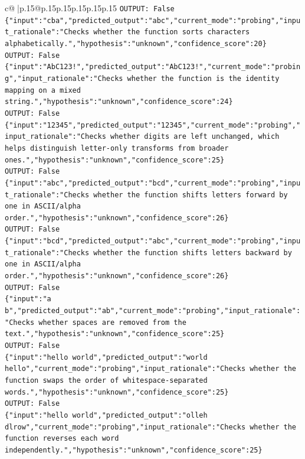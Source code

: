 \documentclass{article}
\begin{document}
{\begin{supertabular}{c@{$\;$}|p{.15\linewidth}@{}p{.15\linewidth}p{.15\linewidth}p{.15\linewidth}p{.15\linewidth}p{.15\linewidth}}
{{{\texttt{OUTPUT: False} \\
\texttt{\{"input":"cba","predicted\_output":"abc","current\_mode":"probing","input\_rationale":"Checks whether the function sorts characters alphabetically.","hypothesis":"unknown","confidence\_score":20\}} \\
\texttt{OUTPUT: False} \\
\texttt{\{"input":"AbC123!","predicted\_output":"AbC123!","current\_mode":"probing","input\_rationale":"Checks whether the function is the identity mapping on a mixed string.","hypothesis":"unknown","confidence\_score":24\}} \\
\texttt{OUTPUT: False} \\
\texttt{\{"input":"12345","predicted\_output":"12345","current\_mode":"probing","input\_rationale":"Checks whether digits are left unchanged, which helps distinguish letter{-}only transforms from broader ones.","hypothesis":"unknown","confidence\_score":25\}} \\
\texttt{OUTPUT: False} \\
\texttt{\{"input":"abc","predicted\_output":"bcd","current\_mode":"probing","input\_rationale":"Checks whether the function shifts letters forward by one in ASCII/alpha order.","hypothesis":"unknown","confidence\_score":26\}} \\
\texttt{OUTPUT: False} \\
\texttt{\{"input":"bcd","predicted\_output":"abc","current\_mode":"probing","input\_rationale":"Checks whether the function shifts letters backward by one in ASCII/alpha order.","hypothesis":"unknown","confidence\_score":26\}} \\
\texttt{OUTPUT: False} \\
\texttt{\{"input":"a b","predicted\_output":"ab","current\_mode":"probing","input\_rationale":"Checks whether spaces are removed from the text.","hypothesis":"unknown","confidence\_score":25\}} \\
\texttt{OUTPUT: False} \\
\texttt{\{"input":"hello world","predicted\_output":"world hello","current\_mode":"probing","input\_rationale":"Checks whether the function swaps the order of whitespace{-}separated words.","hypothesis":"unknown","confidence\_score":25\}} \\
\texttt{OUTPUT: False} \\
\texttt{\{"input":"hello world","predicted\_output":"olleh dlrow","current\_mode":"probing","input\_rationale":"Checks whether the function reverses each word independently.","hypothesis":"unknown","confidence\_score":25\}} \\
}}}
\end{supertabular}}
\end{document}
